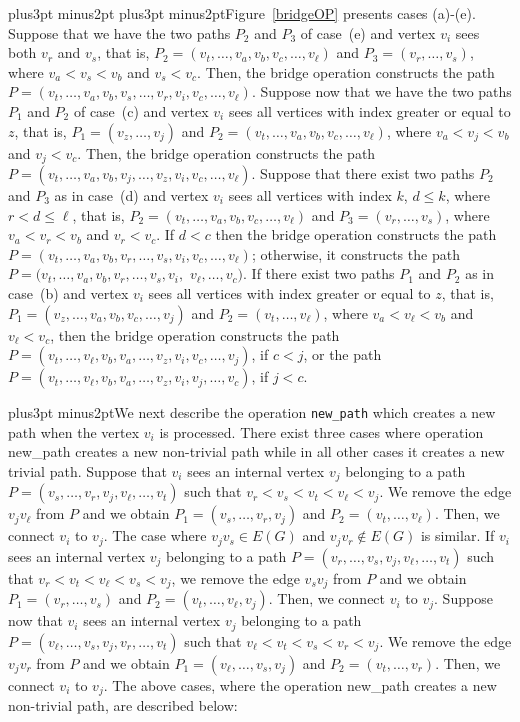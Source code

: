 \documentclass[10pt]{article}
\def\yskip{\penalty-50\vskip3pt plus3pt minus2pt}
\def\y{\yskip}
\def\yy{\yskip\yskip}
\begin{document}
{\yy \noindent Figure~\ref{bridgeOP} presents cases (a)-(e).
Suppose that we have the two paths $P_2$ and $P_3$ of case~(e) and
vertex $v_i$ sees both $v_r$ and $v_s$, that is, $P_2=(v_t,
\ldots, v_a, v_b, v_c, \ldots, v_\ell)$ and $P_3=(v_r, \ldots,
v_s)$, where $v_a<v_s<v_b$ and $v_s<v_c$. Then, the bridge
operation constructs the path $P=(v_t, \ldots, v_a, v_b, v_s,
\ldots, v_r, v_i, v_c, \ldots, v_\ell)$. Suppose now that we have
the two paths $P_1$ and $P_2$ of case~(c) and vertex $v_i$ sees
all vertices with index greater or equal to $z$, that is,
$P_1=(v_z, \ldots, v_j)$ and $P_2=(v_t, \ldots, v_a, v_b, v_c,
\ldots, v_\ell)$, where $v_a<v_j<v_b$ and $v_j<v_c$. Then, the
bridge operation constructs the path $P=(v_t, \ldots, v_a, v_b,
v_j, \ldots, v_z, v_i, v_c, \ldots, v_\ell)$. Suppose that there
exist two paths $P_2$ and $P_3$ as in case~(d) and vertex $v_i$
sees all vertices with index $k$, $d \leq k$, where $r<d \leq
\ell$, that is, $P_2=(v_t, \ldots, v_a, v_b, v_c, \ldots, v_\ell)$
and $P_3=(v_r, \ldots, v_s)$, where $v_a<v_r<v_b$ and $v_r<v_c$.
If $d<c$ then the bridge operation constructs the path $P=(v_t,
\ldots, v_a, v_b, v_r, \ldots, v_s, v_i, v_c, \ldots, v_\ell)$;
otherwise, it constructs the path $P=(v_t, \ldots, v_a, v_b, v_r,
\ldots, v_s, v_i,$ $v_\ell, \ldots, v_c)$. If there exist two
paths $P_1$ and $P_2$ as in case~(b) and vertex $v_i$ sees all
vertices with index greater or equal to $z$, that is, $P_1=(v_z,
\ldots, v_a, v_b, v_c, \ldots, v_j)$ and $P_2=(v_t, \ldots,
v_\ell)$, where $v_a<v_\ell<v_b$ and $v_\ell<v_c$, then the bridge
operation constructs the path $P=(v_t, \ldots, v_\ell, v_b, v_a,
\ldots, v_z, v_i, v_c, \ldots, v_j)$, if $c<j$, or the path
$P=(v_t, \ldots, v_\ell, v_b, v_a, \ldots, v_z, v_i, v_j, \ldots,
v_c)$, if $j<c$.

\y We next describe the operation {\tt new\_path} which creates a
new path when the vertex $v_i$ is processed. There exist three
cases where operation new\_path creates a new non-trivial path
while in all other cases it creates a new trivial path. Suppose
that $v_i$ sees an internal vertex $v_j$ belonging to a path
$P=(v_s, \ldots, v_r, v_j, v_\ell, \ldots, v_t)$ such that
$v_r<v_s<v_t<v_\ell<v_j$. We remove the edge $v_jv_\ell$ from $P$
and we obtain $P_1=(v_s, \ldots, v_r, v_j)$ and $P_2=(v_t, \ldots,
v_\ell)$. Then, we connect $v_i$ to $v_j$. The case where $v_jv_s
\in E(G)$ and $v_jv_r \notin E(G)$ is similar. If $v_i$ sees an
internal vertex $v_j$ belonging to a path $P=(v_r, \ldots, v_s,
v_j, v_\ell, \ldots, v_t)$ such that $v_r<v_t<v_\ell<v_s<v_j$, we
remove the edge $v_sv_j$ from $P$ and we obtain $P_1=(v_r, \ldots,
v_s)$ and $P_2=(v_t, \ldots, v_\ell, v_j)$. Then, we connect $v_i$
to $v_j$. Suppose now that $v_i$ sees an internal vertex $v_j$
belonging to a path $P=(v_\ell, \ldots, v_s, v_j, v_r, \ldots,
v_t)$ such that $v_\ell<v_t<v_s<v_r<v_j$. We remove the edge
$v_jv_r$ from $P$ and we obtain $P_1=(v_\ell, \ldots, v_s, v_j)$
and $P_2=(v_t, \ldots, v_r)$. Then, we connect $v_i$ to $v_j$. The
above cases, where the operation new\_path creates a new
non-trivial path, are described below:

}
\end{document}
